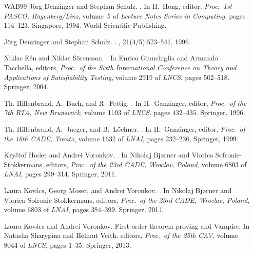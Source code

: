 \documentclass{report}
\begin{document}
\begin{thebibliography}{WAB{\etalchar{+}}99}
J{\"o}rg Denzinger and Stephan Schulz.
.
\newblock In H.~Hong, editor, {\em Proc.\ 1st PASCO, Hagenberg/Linz}, volume~5
  of {\em Lecture Notes Series in Computing}, pages 114--123, Singapore, 1994.
  World Scientific Publishing.

J{\"o}rg Denzinger and Stephan Schulz.
.
, 21(4/5):523--541, 1996.

Niklas E{\'e}n and Niklas S{\"o}rensson.
.
\newblock In Enrico Giunchiglia and Armando Tacchella, editors, {\em Proc.\ of
  the Sixth International Conference on Theory and Applications of
  Satisfiability Testing}, volume 2919 of {\em LNCS}, pages 502--518. Springer,
  2004.

Th. Hillenbrand, A.~Buch, and R.~Fettig.
.
\newblock In H.~Ganzinger, editor, {\em Proc.\ of the 7th RTA, New Brunswick},
  volume 1103 of {\em LNCS}, pages 432--435. Springer, 1996.

Th. Hillenbrand, A.~Jaeger, and B.~L{\"o}chner.
.
\newblock In H.~Ganzinger, editor, {\em Proc.\ of the 16th CADE, Trento},
  volume 1632 of {\em LNAI}, pages 232--236. Springer, 1999.

Kry\v{s}tof Hoder and Andrei Voronkov.
.
\newblock In Nikolaj Bj{\o}rner and Viorica Sofronie-Stokkermans, editors, {\em
  Proc.\ of the 23rd CADE, Wroclav, Poland}, volume 6803 of {\em LNAI}, pages
  299--314. Springer, 2011.

Laura Kov{\'a}cs, Georg Moser, and Andrei Voronkov.
.
\newblock In Nikolaj Bj{\o}rner and Viorica Sofronie-Stokkermans, editors, {\em
  Proc.\ of the 23rd CADE, Wroclav, Poland}, volume 6803 of {\em LNAI}, pages
  384--399. Springer, 2011.

Laura Kov{\'a}cs and Andrei Voronkov.
\newblock First-order theorem proving and {Vampire}.
\newblock In Natasha Sharygina and Helmut Veith, editors, {\em Proc.\ of the
  25th CAV}, volume 8044 of {\em LNCS}, pages 1--35. Springer, 2013.


\end{thebibliography}
\end{document}
